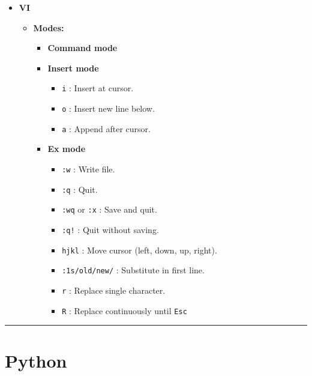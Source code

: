 \documentclass[a4paper,12pt=]{article}
\begin{document}
\begin{itemize}
\begin{itemize}
            \end{itemize}
        \item \textbf{VI}
        \begin{itemize}
            \item \textbf{Modes:}
            \begin{itemize}
                \item \textbf{Command mode}
                \item \textbf{Insert mode}
                    \begin{itemize}
                        \item \texttt{i} : Insert at cursor.
                        \item \texttt{o} : Insert new line below.
                        \item \texttt{a} : Append after cursor.
                    \end{itemize}
            \item \textbf{Ex mode}
                \begin{itemize}
                    \item \texttt{:w} : Write file.
                    \item \texttt{:q} : Quit.
                    \item \texttt{:wq} or \texttt{:x} : Save and quit.
                    \item \texttt{:q!} : Quit without saving.
                    \item \texttt{hjkl} : Move cursor (left, down, up, right).
                    \item \texttt{:1s/old/new/} : Substitute in first line.
                    \item \texttt{r} : Replace single character.
                    \item \texttt{R} : Replace continuously until \texttt{Esc}
                \end{itemize}
            
            \end{itemize}
        \end{itemize}
        
    \end{itemize}

\rule{\linewidth}{0.1pt}

\section{Python}
\end{document}
